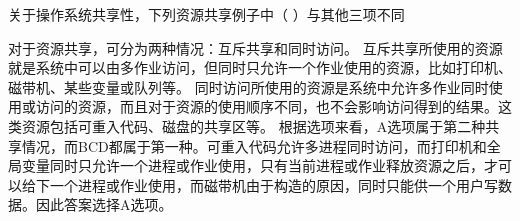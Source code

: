 \question 关于操作系统共享性，下列资源共享例子中（ ）与其他三项不同
\par{}
\begin{solution}对于资源共享，可分为两种情况：互斥共享和同时访问。
互斥共享所使用的资源就是系统中可以由多作业访问，但同时只允许一个作业使用的资源，比如打印机、磁带机、某些变量或队列等。
同时访问所使用的资源是系统中允许多作业同时使用或访问的资源，而且对于资源的使用顺序不同，也不会影响访问得到的结果。这类资源包括可重入代码、磁盘的共享区等。
根据选项来看，A选项属于第二种共享情况，而BCD都属于第一种。可重入代码允许多进程同时访问，而打印机和全局变量同时只允许一个进程或作业使用，只有当前进程或作业释放资源之后，才可以给下一个进程或作业使用，而磁带机由于构造的原因，同时只能供一个用户写数据。因此答案选择A选项。
\end{solution}
